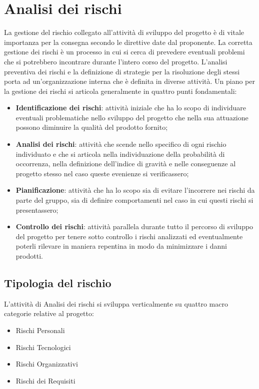 \section{Analisi dei rischi} \label{_analisiDeiRischi}
	La gestione del rischio collegato all'attività di sviluppo del progetto è di vitale importanza per la consegna secondo le direttive date dal proponente. La corretta gestione dei rischi è un processo in cui si cerca di prevedere eventuali problemi che si potrebbero incontrare durante l'intero corso del progetto. L'analisi preventiva dei rischi e la definizione di strategie per la risoluzione degli stessi porta ad un'organizzazione interna che è definita in diverse attività.
	Un piano per la gestione dei rischi si articola generalmente in quattro punti fondamentali: 
\begin{itemize}
	\item \textbf{Identificazione dei rischi}: attività iniziale che ha lo scopo di individuare eventuali problematiche nello sviluppo del progetto che nella sua attuazione possono diminuire la qualità del prodotto fornito;
	\item \textbf{Analisi dei rischi}: attività che scende nello specifico di ogni rischio individuato e che si articola nella individuazione della probabilità di occorrenza, nella definizione dell'indice di gravità e nelle conseguenze al progetto stesso nel caso queste evenienze si verificassero;
	\item \textbf{Pianificazione}: attività che ha lo scopo sia di evitare l'incorrere nei rischi da parte del gruppo, sia di definire comportamenti nel caso in cui questi rischi si presentassero;
	\item \textbf{Controllo dei rischi}: attività parallela durante tutto il percorso di sviluppo del progetto per tenere sotto controllo i rischi analizzati ed eventualmente poterli rilevare in maniera repentina in modo da minimizzare i danni prodotti.
\end{itemize}

\subsection{Tipologia del rischio}
L'attività di Analisi dei rischi si sviluppa verticalmente su quattro macro categorie relative al progetto:
\begin{itemize}
	\item Rischi Personali
	\item Rischi Tecnologici
	\item Rischi Organizzativi
	\item Rischi dei Requisiti
\end{itemize}

